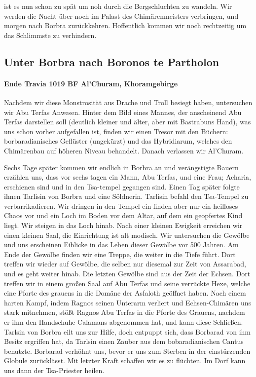 ist es nun schon zu spät um noh durch die Bergschluchten zu wandeln. Wir werden die Nacht über noch im Palast des Chimärenmeisters verbringen, und morgen nach Borbra zurückkehren. Hoffentlich kommen wir noch rechtzeitig um das Schlimmste zu verhindern.

\subsection{Unter Borbra nach Boronos te Partholon}

\paragraph{Ende Travia 1019 BF Al'Churam, Khoramgebirge}
Nachdem wir diese Monstrosität aus Drache und Troll besiegt haben, untersuchen wir Abu Terfas Anwesen. Hinter dem Bild eines Mannes, der anscheinend Abu Terfas darstellen soll (deutlich kleiner und älter, aber mit Bastrabuns Hand), was uns schon vorher aufgefallen ist, finden wir einen Tresor mit den Büchern: borbaradianisches Geflüster (ungekürzt) und das Hybridiarum, welches den Chimärenbau auf höheren Niveau behandelt.
Danach verlassen wir Al'Churam.

Sechs Tage später kommen wir endlich in Borbra an und verängstigte Bauern erzählen uns, dass vor sechs tagen ein Mann, Abu Terfas, und eine Frau; Acharia, erschienen sind und in den Tsa-tempel gegangen sind. Einen Tag später folgte ihnen Tarlisin von Borbra und eine Söldnerin. Tarlisin befahl den Tsa-Tempel zu verbarrikadieren. Wir dringen in den Tempel ein finden aber nur ein heilloses Chaos vor und ein Loch im Boden vor dem Altar, auf dem ein geopfertes Kind liegt. Wir steigen in das Loch hinab.
Nach einer kleinen Ewigkeit erreichen wir einen kleinen Saal, die Einrichtung ist alt modisch. Wir untersuchen die Gewölbe und uns erscheinen Eiblicke in das Leben dieser Gewölbe vor 500 Jahren. Am Ende der Gewölbe finden wir eine Treppe, die weiter in die Tiefe führt. Dort treffen wir wieder auf Gewölbe, die selben nur diesemal zur Zeit von Assarabad, und es geht weiter hinab. Die letzten Gewölbe sind aus der Zeit der Echsen. Dort treffen wir in einem großen Saal auf Abu Terfas und seine verrückte Hexe, welche eine Pforte des grauens in die Domäne der Asfaloth geöffnet haben.
Nach einem harten Kampf, indem Ragnos seinen Unterarm verliert und Echsen-Chimären uns stark mitnehmen, stößt Ragnos Abu Terfas in die Pforte des Grauens, nachdem er ihm den Handschuhe Calamans abgenommen hat, und kann diese Schließen.
Tarlsin von Borbra eilt uns zur Hilfe, doch entpuppt sich, dass Borbarad von ihm Besitz ergriffen hat, da Tarlsin einen Zauber aus dem bobaradianischen Cantus benutzte. Borbarad verhöhnt uns, bevor er uns zum Sterben in der einstürzenden Globule zurücklässt. Mit letzter Kraft schaffen wir es zu flüchten. Im Dorf kann uns dann der Tsa-Priester heilen.

